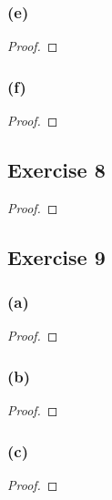 \documentclass[14pt]{extarticle}
\begin{document}
\subsubsection{(e)}

\begin{proof}

\end{proof}

\subsubsection{(f)}

\begin{proof}

\end{proof}

\subsection{Exercise 8}

\begin{proof}

\end{proof}

\subsection{Exercise 9}

\subsubsection{(a)}

\begin{proof}

\end{proof}

\subsubsection{(b)}

\begin{proof}

\end{proof}

\subsubsection{(c)}

\begin{proof}

\end{proof}
\end{document}
